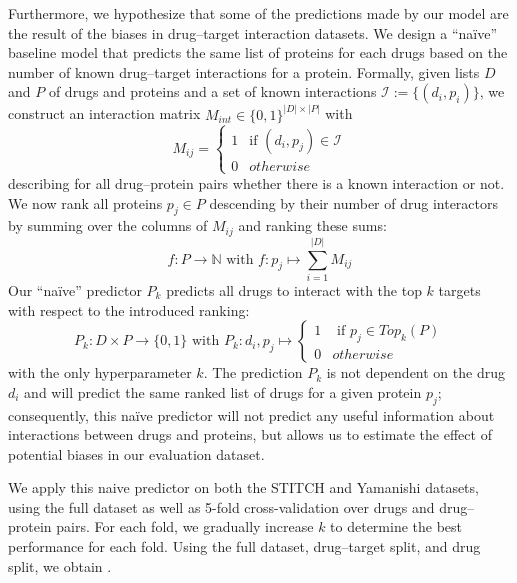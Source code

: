 \documentclass{bioinfo}
\begin{document}
Furthermore, we hypothesize that some of the predictions made by our
model are the result of the biases in drug--target interaction
datasets. We design a ``na\"ive'' baseline model that predicts the
same list of proteins for each drugs based on the number of
known drug--target interactions for a protein. Formally, given lists
$D$ and $P$ of drugs and proteins and a set of known interactions
$\mathcal{I} := \{(d_i, p_i) \}$, we construct an interaction matrix
$M_{int}\in\{0,1\}^{|D|\times|P|}$ with
\begin{equation*}
	M_{ij} = \begin{cases}
		1 & \text{if } (d_i, p_j)\in \mathcal{I}\\
		0 & otherwise
	\end{cases}
\end{equation*}
describing for all drug--protein pairs whether there is a known
interaction or not. We now rank all proteins $p_j\in P$ descending by
their number of drug interactors by summing over the columns of
$M_{ij}$ and ranking these sums:
\begin{equation*}
	f: P \rightarrow \mathbb{N} \text{ with } f:p_j \mapsto \sum_{i=1}^{|D|}M_{ij}
\end{equation*}
Our ``na\"ive'' predictor $P_k$  predicts all drugs to interact with
the top $k$ targets
with respect to
the introduced ranking:
\begin{equation*}
	P_k: D\times P \rightarrow \{0,1\} \text{ with } P_k: d_i, p_j \mapsto \begin{cases}
		1 & \text{ if }p_j \in Top_{k}(P)\\
		0 & otherwise
	\end{cases}
\end{equation*}
with the only hyperparameter $k$.
The prediction $P_k$ is not dependent on the drug $d_i$ and will
predict the same ranked list of drugs for a given protein $p_j$;
consequently, this na\"ive predictor will not predict any useful
information about interactions between drugs and proteins, but allows
us to estimate the effect of potential biases in our evaluation
dataset.

We apply this naive predictor on both the STITCH and Yamanishi
datasets, using the full dataset as well as 5-fold cross-validation
over drugs and drug--protein pairs.
For each fold, we gradually increase $k$ to determine the best
performance for each fold. Using the full dataset, drug--target split,
and drug split, we obtain .
\end{document}
